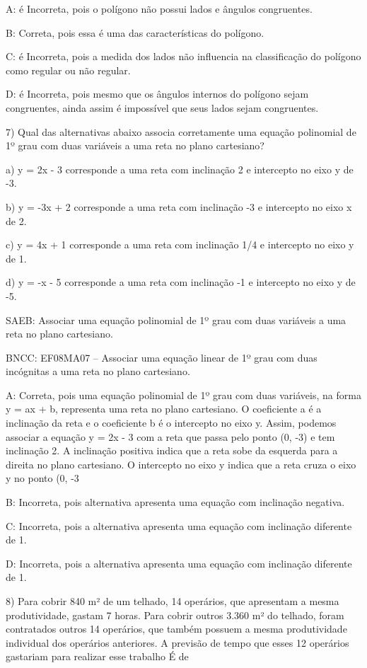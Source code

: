 A: é Incorreta, pois o polígono não possui lados e ângulos congruentes.

B: Correta, pois essa é uma das características do polígono.

C: é Incorreta, pois a medida dos lados não influencia na classificação
do polígono como regular ou não regular.

D: é Incorreta, pois mesmo que os ângulos internos do polígono sejam
congruentes, ainda assim é impossível que seus lados sejam congruentes.

7) Qual das alternativas abaixo associa corretamente uma equação
polinomial de 1º grau com duas variáveis a uma reta no plano cartesiano?

a) y = 2x - 3 corresponde a uma reta com inclinação 2 e intercepto no
eixo y de -3.

b) y = -3x + 2 corresponde a uma reta com inclinação -3 e intercepto no
eixo x de 2.

c) y = 4x + 1 corresponde a uma reta com inclinação 1/4 e intercepto no
eixo y de 1.

d) y = -x - 5 corresponde a uma reta com inclinação -1 e intercepto no
eixo y de -5.

SAEB: Associar uma equação polinomial de 1º grau com duas variáveis a
uma reta no plano cartesiano.

BNCC: EF08MA07 -- Associar uma equação linear de 1º grau com duas
incógnitas a uma reta no plano cartesiano.

A: Correta, pois uma equação polinomial de 1º grau com duas variáveis,
na forma y = ax + b, representa uma reta no plano cartesiano. O
coeficiente a é a inclinação da reta e o coeficiente b é o intercepto no
eixo y. Assim, podemos associar a equação y = 2x - 3 com a reta que
passa pelo ponto (0, -3) e tem inclinação 2. A inclinação positiva
indica que a reta sobe da esquerda para a direita no plano cartesiano. O
intercepto no eixo y indica que a reta cruza o eixo y no ponto (0, -3

B: Incorreta, pois alternativa apresenta uma equação com inclinação
negativa.

C: Incorreta, pois a alternativa apresenta uma equação com inclinação
diferente de 1.

D: Incorreta, pois a alternativa apresenta uma equação com inclinação
diferente de 1.

8) Para cobrir 840 m² de um telhado, 14 operários, que apresentam a
mesma produtividade, gastam 7 horas. Para cobrir outros 3.360 m² do
telhado, foram contratados outros 14 operários, que também possuem a
mesma produtividade individual dos operários anteriores. A previsão de
tempo que esses 12 operários gastariam para realizar esse trabalho É de

